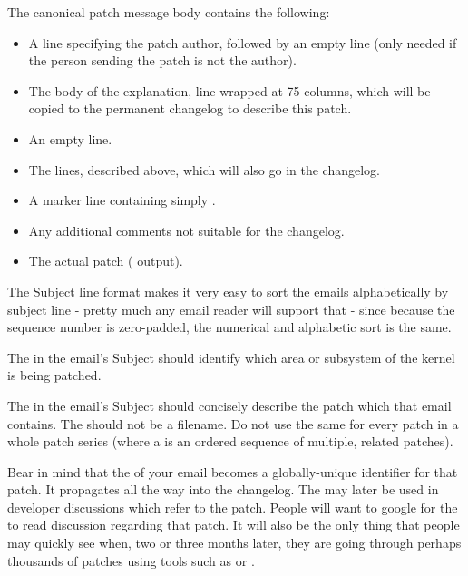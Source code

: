 \documentclass[a4paper,8pt,english]{sphinxmanual}
\begin{document}
The canonical patch message body contains the following:
\begin{itemize}
\item {} 
A  line specifying the patch author, followed by an empty
line (only needed if the person sending the patch is not the author).

\item {} 
The body of the explanation, line wrapped at 75 columns, which will
be copied to the permanent changelog to describe this patch.

\item {} 
An empty line.

\item {} 
The  lines, described above, which will
also go in the changelog.

\item {} 
A marker line containing simply \code{-{-}-}.

\item {} 
Any additional comments not suitable for the changelog.

\item {} 
The actual patch ( output).

\end{itemize}

The Subject line format makes it very easy to sort the emails
alphabetically by subject line - pretty much any email reader will
support that - since because the sequence number is zero-padded,
the numerical and alphabetic sort is the same.

The  in the email's Subject should identify which
area or subsystem of the kernel is being patched.

The  in the email's Subject should concisely
describe the patch which that email contains.  The  should not be a filename.  Do not use the same  for every patch in a whole patch series (where a  is an ordered sequence of multiple, related patches).

Bear in mind that the  of your email becomes a
globally-unique identifier for that patch.  It propagates all the way
into the  changelog.  The  may later be used in
developer discussions which refer to the patch.  People will want to
google for the  to read discussion regarding that
patch.  It will also be the only thing that people may quickly see
when, two or three months later, they are going through perhaps
thousands of patches using tools such as  or .
\end{document}
